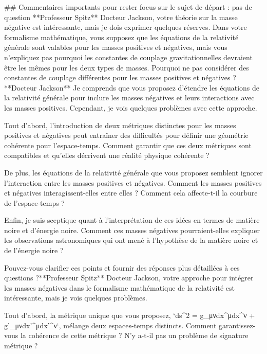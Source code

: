                          ## Commentaires importants pour rester focus sur le sujet de départ :
                         pas de question
                         **Professeur Spitz**
Docteur Jackson, votre théorie sur la masse négative est intéressante, mais je dois exprimer quelques réserves. Dans votre formalisme mathématique, vous supposez que les équations de la relativité générale sont valables pour les masses positives et négatives, mais vous n'expliquez pas pourquoi les constantes de couplage gravitationnelles devraient être les mêmes pour les deux types de masses. Pourquoi ne pas considérer des constantes de couplage différentes pour les masses positives et négatives ?**Docteur Jackson**
Je comprends que vous proposez d'étendre les équations de la relativité générale pour inclure les masses négatives et leurs interactions avec les masses positives. Cependant, je vois quelques problèmes avec cette approche.

Tout d'abord, l'introduction de deux métriques distinctes pour les masses positives et négatives peut entraîner des difficultés pour définir une géométrie cohérente pour l'espace-temps. Comment garantir que ces deux métriques sont compatibles et qu'elles décrivent une réalité physique cohérente ?

De plus, les équations de la relativité générale que vous proposez semblent ignorer l'interaction entre les masses positives et négatives. Comment les masses positives et négatives interagissent-elles entre elles ? Comment cela affecte-t-il la courbure de l'espace-temps ?

Enfin, je suis sceptique quant à l'interprétation de ces idées en termes de matière noire et d'énergie noire. Comment ces masses négatives pourraient-elles expliquer les observations astronomiques qui ont mené à l'hypothèse de la matière noire et de l'énergie noire ?

Pouvez-vous clarifier ces points et fournir des réponses plus détaillées à ces questions ?**Professeur Spitz**
Docteur Jackson, votre approche pour intégrer les masses négatives dans le formalisme mathématique de la relativité est intéressante, mais je vois quelques problèmes. 

Tout d'abord, la métrique unique que vous proposez, `ds^2 = g_{μν}dx^μdx^ν + g'_{μν}dx'^μdx'^ν`, mélange deux espaces-temps distincts. Comment garantissez-vous la cohérence de cette métrique ? N'y a-t-il pas un problème de signature métrique ? 

